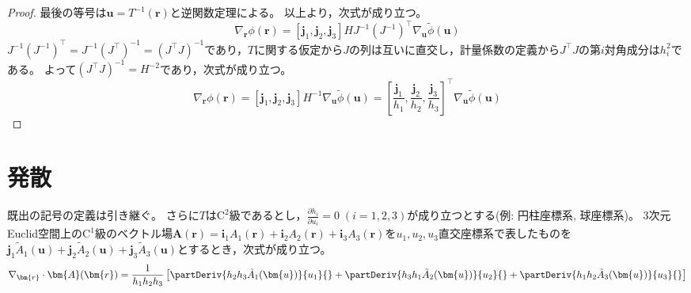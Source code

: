 \begin{proof}
            最後の等号は$\bm{u} = T^{-1}(\bm{r})$と逆関数定理による。
            以上より，次式が成り立つ。
            \[ \nabla_\bm{r}\phi(\bm{r}) = [\bm{j}_1,\bm{j}_2,\bm{j}_3]HJ^{-1}\left(J^{-1}\right)^\top\nabla_\bm{u}\tilde{\phi}(\bm{u}) \]
            $J^{-1}\left(J^{-1}\right)^\top = J^{-1}\left(J^\top\right)^{-1} = \left(J^\top J\right)^{-1}$であり，$T$に関する仮定から$J$の列は互いに直交し，計量係数の定義から$J^\top J$の第$i$対角成分は$h_i^2$である。
            よって$\left(J^\top J\right)^{-1} = H^{-2}$であり，次式が成り立つ。
            \[ \nabla_\bm{r}\phi(\bm{r}) = [\bm{j}_1,\bm{j}_2,\bm{j}_3]H^{-1}\nabla_\bm{u}\tilde{\phi}(\bm{u}) = \left[\frac{\bm{j}_1}{h_1}, \frac{\bm{j}_2}{h_2}, \frac{\bm{j}_3}{h_3}\right]^\top\nabla_\bm{u}\tilde{\phi}(\bm{u}) \]
        \end{proof}
    \section{発散}
        \label{発散}
        \begin{shadebox}
            既出の記号の定義は引き継ぐ。
            さらに$T$は$\textrm{C}^2$級であるとし，$\frac{\partial h_i}{\partial u_i} = 0\;(i=1,2,3)$が成り立つとする(例: 円柱座標系, 球座標系)。
            3次元Euclid空間上の$\mathrm{C}^1$級のベクトル場$\bm{A}(\bm{r}) = \bm{i}_1 A_1(\bm{r}) + \bm{i}_2 A_2(\bm{r}) + \bm{i}_3 A_3(\bm{r})$を$u_1,u_2,u_3$直交座標系で表したものを$\bm{j}_1 \tilde{A}_1(\bm{u}) + \bm{j}_2 \tilde{A}_2(\bm{u}) + \bm{j}_3 \tilde{A}_3(\bm{u})$とするとき，次式が成り立つ。
            \[ \nabla_\bm{r}\cdot\bm{A}(\bm{r}) = \frac{1}{h_1 h_2 h_3}\left[ \partDeriv{h_2 h_3 \tilde{A}_1(\bm{u})}{u_1}{} + \partDeriv{h_3 h_1 \tilde{A}_2(\bm{u})}{u_2}{} + \partDeriv{h_1 h_2 \tilde{A}_3(\bm{u})}{u_3}{} \right] \]
        \end{shadebox}
